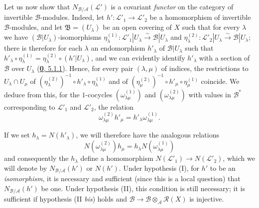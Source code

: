 \begin{env}[6.5.3]
\label{II.6.5.3}
Let us now show that $N_{\mathcal{B}/\mathcal{A}}(\mathcal{L}')$ is a
covariant \emph{functor} on the category of invertible
$\mathcal{B}$-modules. Indeed, let $h':\mathcal{L}'_1\to\mathcal{L}'_2$ be a
homomorphism of invertible $\mathcal{B}$-modules, and let
$\mathfrak{B}=(U_\lambda)$ be an open covering of $X$ such that for every
$\lambda$ we have $(\mathcal{B}|U_\lambda)$-isomorphisms
$\eta^{(1)}_\lambda:\mathcal{L}'_1|U_\lambda\xrightarrow{\sim}\mathcal{B}|U_\lambda$ and
$\eta^{(2)}_\lambda:\mathcal{L}'_2|U_\lambda\xrightarrow{\sim}\mathcal{B}|U_\lambda$;
there is therefore for each $\lambda$ an endomorphism $h'_\lambda$ of
$\mathcal{B}|U_\lambda$ such that
$h'_\lambda\circ\eta^{(1)}_\lambda
=\eta^{(2)}_\lambda\circ(h'|U_\lambda)$, and we can evidently identify
$h'_\lambda$ with a section of $\mathcal{B}$ over $U_\lambda$
(\hyperref[0.5.1.1]{\textbf{0}, 5.1.1}). Hence, for every pair $(\lambda,\mu)$ of
indices, the restrictions to $U_\lambda\cap U_\mu$ of
$(\eta^{(2)}_\lambda)^{-1}\circ h'_\lambda\circ\eta^{(1)}_\lambda$ and of
$(\eta^{(2)}_\mu)^{-1}\circ h'_\mu\circ\eta^{(1)}_\mu$ coincide. We deduce
from this, for the $1$-cocycles $(\omega^{(1)}_{\lambda\mu})$ and
$(\omega^{(2)}_{\lambda\mu})$ with values in $\mathcal{B}^*$ corresponding to
$\mathcal{L}'_1$ and $\mathcal{L}'_2$, the relation
\[
\omega^{(2)}_{\lambda\mu}h'_\mu
=h'_\lambda\omega^{(1)}_{\lambda\mu}.
\]


If we set $h_\lambda=N(h'_\lambda)$, we will therefore have the analogous
relations
\[
N(\omega^{(2)}_{\lambda\mu})h_\mu
=h_\lambda N(\omega^{(1)}_{\lambda\mu})
\]
and consequently the $h_\lambda$ define a homomorphism
$N(\mathcal{L}'_1)\to N(\mathcal{L}'_2)$, which we will denote by
$N_{\mathcal{B}/\mathcal{A}}(h')$ or $N(h')$. Under hypothesis (I), for
$h'$ to be an \emph{isomorphism}, it is necessary and sufficient (since this
is a local question) that $N_{\mathcal{B}/\mathcal{A}}(h')$ be one. Under
hypothesis (II), this condition is still necessary; it is sufficient if
hypothesis (II \emph{bis}) holds and
$\mathcal{B}\to\mathcal{B}\otimes_{\mathcal{A}}\mathcal{R}(X)$ is injective.


\end{env}
